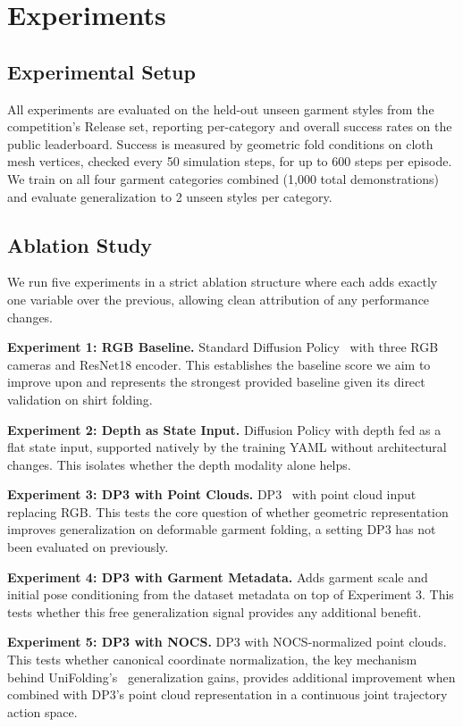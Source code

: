 \section{Experiments}

\subsection{Experimental Setup}

All experiments are evaluated on the held-out unseen garment styles from the competition's Release set, reporting per-category and overall success rates on the public leaderboard. Success is measured by geometric fold conditions on cloth mesh vertices, checked every 50 simulation steps, for up to 600 steps per episode. We train on all four garment categories combined (1,000 total demonstrations) and evaluate generalization to 2 unseen styles per category.

\subsection{Ablation Study}

We run five experiments in a strict ablation structure where each adds exactly one variable over the previous, allowing clean attribution of any performance changes.

\textbf{Experiment 1: RGB Baseline.} Standard Diffusion Policy~\cite{chi2023diffusionpolicy} with three RGB cameras and ResNet18 encoder. This establishes the baseline score we aim to improve upon and represents the strongest provided baseline given its direct validation on shirt folding.

\textbf{Experiment 2: Depth as State Input.} Diffusion Policy with depth fed as a flat state input, supported natively by the training YAML without architectural changes. This isolates whether the depth modality alone helps.

\textbf{Experiment 3: DP3 with Point Clouds.} DP3~\cite{ze2024dp3} with point cloud input replacing RGB. This tests the core question of whether geometric representation improves generalization on deformable garment folding, a setting DP3 has not been evaluated on previously.

\textbf{Experiment 4: DP3 with Garment Metadata.} Adds garment scale and initial pose conditioning from the dataset metadata on top of Experiment 3. This tests whether this free generalization signal provides any additional benefit.

\textbf{Experiment 5: DP3 with NOCS.} DP3 with NOCS-normalized point clouds. This tests whether canonical coordinate normalization, the key mechanism behind UniFolding's~\cite{unifolding2023} generalization gains, provides additional improvement when combined with DP3's point cloud representation in a continuous joint trajectory action space.

